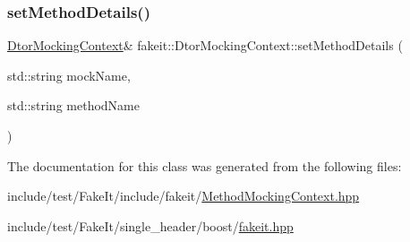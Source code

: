 \subsubsection{\texorpdfstring{setMethodDetails()}{setMethodDetails()}\hspace{0.1cm}{\footnotesize\ttfamily [9/9]}}
{\footnotesize\ttfamily \mbox{\hyperlink{classfakeit_1_1DtorMockingContext}{Dtor\+Mocking\+Context}}\& fakeit\+::\+Dtor\+Mocking\+Context\+::set\+Method\+Details (\begin{DoxyParamCaption}\item[{std\+::string}]{mock\+Name,  }\item[{std\+::string}]{method\+Name }\end{DoxyParamCaption})\hspace{0.3cm}{\ttfamily [inline]}}



The documentation for this class was generated from the following files\+:\begin{DoxyCompactItemize}
\item 
include/test/\+Fake\+It/include/fakeit/\mbox{\hyperlink{MethodMockingContext_8hpp}{Method\+Mocking\+Context.\+hpp}}\item 
include/test/\+Fake\+It/single\+\_\+header/boost/\mbox{\hyperlink{single__header_2boost_2fakeit_8hpp}{fakeit.\+hpp}}\end{DoxyCompactItemize}

